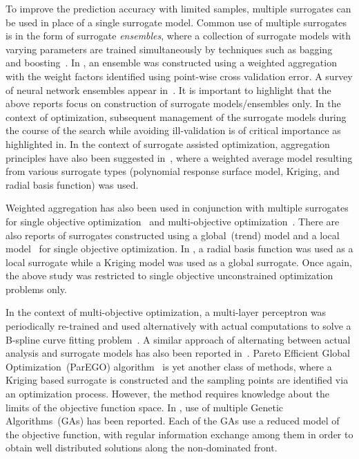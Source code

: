 To improve the prediction accuracy with limited samples, multiple surrogates can be used in place of a single surrogate model. Common use of multiple surrogates is in the form of surrogate \textit{ensembles}, where a collection of surrogate models with varying parameters are trained simultaneously by techniques such as bagging~\cite{breiman_bagging_1996} and boosting~\cite{abney_boosting_1999}. In \cite{acar2010ensemble}, an ensemble was constructed using a weighted aggregation with the weight factors identified using point-wise cross validation error. A survey of neural network ensembles appear in~\cite{zhao_survey_2005}. It is important to highlight that the above reports focus on construction of surrogate models/ensembles only. In the context of optimization, subsequent management of the surrogate models during the course of the search while avoiding ill-validation is of critical importance as highlighted in\cite{jin2005csf}. In the context of surrogate assisted optimization, aggregation principles have also been suggested in~\cite{goel_ensemble_2007,zerpa_optimization_2005, hamza2012co}, where a weighted average model resulting from various surrogate types (polynomial response surface model, Kriging, and radial basis function) was used. 

Weighted aggregation has also been used in conjunction with multiple surrogates for single objective optimization~\cite{glaz2009rotor} and multi-objective optimization~\cite{mack2005bluff}. There are also reports of surrogates constructed using a global~(trend) model and a local model~\cite{goel2006perf, zhou_memetic_2007} for single objective optimization. In \cite{zhou_combining_2007}, a radial basis function was used as a local surrogate while a Kriging model was used as a global surrogate. Once again, the above study was restricted to single objective unconstrained optimization problems only.

In the context of multi-objective optimization, a multi-layer perceptron was periodically re-trained and used alternatively with actual computations to solve a B-spline curve fitting problem~\cite{nain_computationally_2002}. A similar approach of alternating between actual analysis and surrogate models has also been reported in~\cite{ray2006sae}. Pareto Efficient Global Optimization~(ParEGO) algorithm~\cite{knowles2006pha} is yet another class of methods, where a Kriging based surrogate is constructed and the sampling points are identified via an optimization process. However, the method requires knowledge about the limits of the objective function space. In \cite{chafekar2005mgo}, use of multiple Genetic Algorithms~(GAs) has been reported. Each of the GAs use a reduced model of the objective function, with regular information exchange among them in order to obtain well distributed solutions along the non-dominated front.

